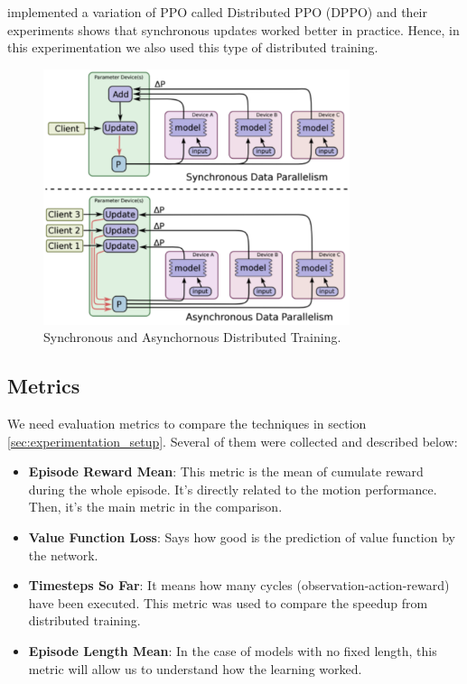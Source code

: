 \cite{heess2017} implemented a variation of PPO called Distributed PPO (DPPO) and their experiments shows that synchronous updates worked better in practice. Hence, in this experimentation we also used this type of distributed training.

\begin{figure}[!htbp]
	\centering
	\includegraphics[width=0.8\textwidth]{Cap5/distributedtraining.eps}
	\caption{ Synchronous and Asynchornous Distributed Training.
	}
	\label{fig:distributedtraining}
\end{figure}

\subsection{Metrics}

We need evaluation metrics to compare the techniques in section \ref{sec:experimentation_setup}. Several of them were collected and described below:

\begin{itemize}
	\item \textbf{Episode Reward Mean}: This metric is the mean of cumulate reward during the whole episode. It's directly related to the motion performance. Then, it's the main metric in the comparison.
	\item \textbf{Value Function Loss}: Says how good is the prediction of value function by the network.
	\item \textbf{Timesteps So Far}: It means how many cycles (observation-action-reward) have been executed. This metric was used to compare the speedup from distributed training.
	\item \textbf{Episode Length Mean}: In the case of models with no fixed length, this metric will allow us to understand how the learning worked.
\end{itemize} 

